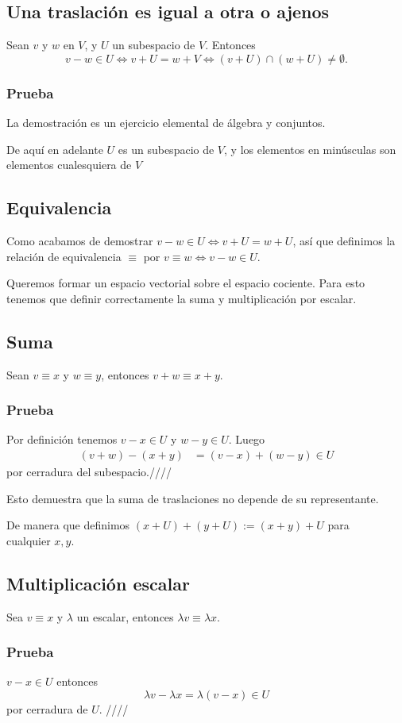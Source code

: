 \documentclass{article}
\begin{document}
\subsection{Una traslación es igual a otra o ajenos}\label{traslaciones}
Sean $v$ y $w$ en $V$, y $U$ un subespacio de $V$. Entonces
$$v-w\in U \iff v+U = w+V \iff (v+U)\cap(w+U)\neq\emptyset.$$
\subsubsection*{Prueba}
La demostración es un ejercicio elemental de álgebra y conjuntos.

De aquí en adelante $U$ es un subespacio de $V$, y los elementos en
minúsculas son elementos cualesquiera de $V$
\subsection{Equivalencia}
Como acabamos de demostrar $v-w\in U \iff v+U=w+U$,
así que definimos la relación de equivalencia $\equiv$ por
$v\equiv w \iff v-w\in U$.

Queremos formar un espacio vectorial sobre el espacio cociente.
Para esto tenemos que definir correctamente la suma y multiplicación 
por escalar.

\subsection{Suma}
Sean $v\equiv x$ y $w\equiv y$, entonces $v+w \equiv x+y$.
\subsubsection*{Prueba}
Por definición tenemos $v-x\in U$ y $w-y\in U$.
Luego
\begin{align*}
    (v+w) - (x+y) &= (v-x) + (w-y) \in U
\end{align*} 
por cerradura del subespacio.\hfill ////

Esto demuestra que la suma de traslaciones no depende de su
representante.

De manera que definimos $(x+U)+(y+U) := (x+y)+U$ para \\
cualquier $x,y$.


\subsection{Multiplicación escalar}
Sea $v\equiv x$ y $\lambda$ un escalar, entonces
$\lambda v\equiv \lambda x$.
\subsubsection*{Prueba}
$v-x\in U$ entonces
$$\lambda v -\lambda x = \lambda(v-x) \in U$$
por cerradura de $U$. \hfill ////
\end{document}

